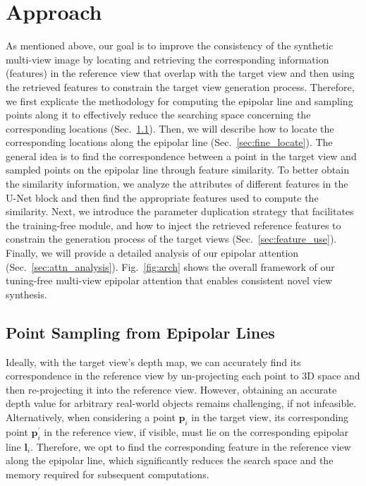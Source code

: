 \section{Approach}
As mentioned above, our goal is to improve the consistency of the synthetic multi-view image by locating and retrieving the corresponding information (features) in the reference view that overlap with the target view and then using the retrieved features to constrain the target view generation process.
Therefore, we first explicate the methodology for computing the epipolar line and sampling points along it to effectively reduce the searching space concerning the corresponding locations (Sec.~\ref{sec:epi_sample}).
Then, we will describe how to locate the corresponding locations along the epipolar line (Sec.~\ref{sec:fine_locate}). The general idea is to find the correspondence between a point in the target view and sampled points on the epipolar line through feature similarity. To better obtain the similarity information, we analyze the attributes of different features in the U-Net block and then find the appropriate features used to compute the similarity.
Next, we introduce the parameter duplication strategy that facilitates the training-free module, and how to inject the retrieved reference features to constrain the generation process of the target views (Sec.~\ref{sec:feature_use}). 
Finally, we will provide a detailed analysis of our epipolar attention (Sec.~\ref{sec:attn_analysis}).
Fig.~\ref{fig:arch} shows the overall framework of our tuning-free multi-view epipolar attention that enables consistent novel view synthesis.




\subsection{Point Sampling from Epipolar Lines}\label{sec:epi_sample}
Ideally, with the target view's depth map, we can accurately find its correspondence in the reference view by un-projecting each point to 3D space and then re-projecting it into the reference view.
However, obtaining an accurate depth value for arbitrary real-world objects remains challenging, if not infeasible. 
Alternatively, when considering a point $\boldsymbol{p}_i$ in the target view, its corresponding point $\boldsymbol{p}^{\prime}_i$ in the reference view, if visible, must lie on the corresponding epipolar line $\mathbf{l}_i$.
Therefore, we opt to find the corresponding feature in the reference view along the epipolar line, which significantly reduces the search space and the memory required for subsequent computations.

